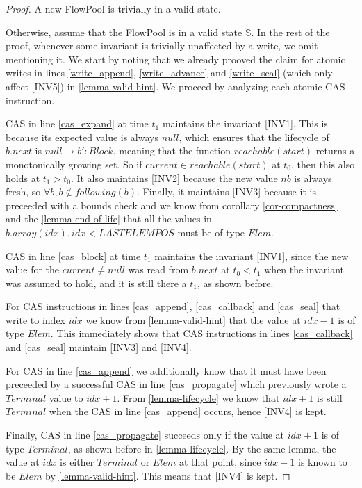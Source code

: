 \documentclass[runningheads,a4paper]{llncs}
\begin{document}
\begin{proof}
A new FlowPool is trivially in a valid state.

Otherwise, assume that the FlowPool is in a valid state
$\mathbb{S}$.
In the rest of the proof, whenever some invariant is trivially
unaffected by a write, we omit mentioning it.
We start by noting that we already prooved the claim
for atomic writes in lines \ref{write_append}, \ref{write_advance} and
\ref{write_seal} (which only affect [INV5]) in \ref{lemma-valid-hint}.
We proceed by analyzing each atomic CAS instruction.

CAS in line \ref{cas_expand} at time $t_1$ maintains the invariant
[INV1].
This is because its expected value is always
$null$, which ensures that the lifecycle of $b.next$ is $null
\rightarrow b': Block$, meaning that the function $reachable(start)$
returns a monotonically growing set.
So if $current \in reachable(start)$ at $t_0$, then this also holds at
$t_1 > t_0$.
It also maintains [INV2] because the new value $nb$ is always fresh,
so $\forall b, b \not \in following(b)$.
Finally, it maintains [INV3] because it is preceeded with a bounds
check and we know from corollary \ref{cor-compactness} and the
\ref{lemma-end-of-life} that all the values in $b.array(idx),
idx < LASTELEMPOS$ must be of type $Elem$.

CAS in line \ref{cas_block} at time $t_1$ maintains the
invariant [INV1], since the new value for the $current \neq null$ was read from
$b.next$ at $t_0 < t_1$ when the invariant was assumed to hold, and
it is still there a $t_1$, as shown before.

For CAS instructions in lines \ref{cas_append}, \ref{cas_callback} and
\ref{cas_seal} that write to index $idx$ we know from 
\ref{lemma-valid-hint} that the value at $idx - 1$ is of type $Elem$.
This immediately shows that CAS instructions in lines
\ref{cas_callback} and \ref{cas_seal} maintain [INV3] and [INV4].

For CAS in line \ref{cas_append} we additionally know that it must
have been preceeded by a successful CAS in line \ref{cas_propagate}
which previously wrote a $Terminal$ value to $idx + 1$. From 
\ref{lemma-lifecycle} we know that $idx + 1$ is still $Terminal$ when
the CAS in line \ref{cas_append} occurs, hence [INV4] is kept.

Finally, CAS in line \ref{cas_propagate} succeeds only if the value at
$idx + 1$ is of type $Terminal$, as shown before in 
\ref{lemma-lifecycle}.
By the same lemma, the value at $idx$ is either
$Terminal$ or $Elem$ at that point, since $idx - 1$ is known to be
$Elem$ by \ref{lemma-valid-hint}.
This means that [INV4] is kept.
\end{proof}
\end{document}

